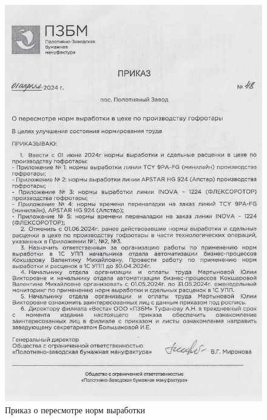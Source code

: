 \begin{figure}
\begin{center}
\includegraphics[height=0.8\textheight, width=1.5\textwidth, keepaspectratio]{Pics/XI.11..jpg}
\end{center}
\caption{Приказ о пересмотре норм выработки}
\label{pic:XI.11..jpg}
\end{figure}
\clearpage

